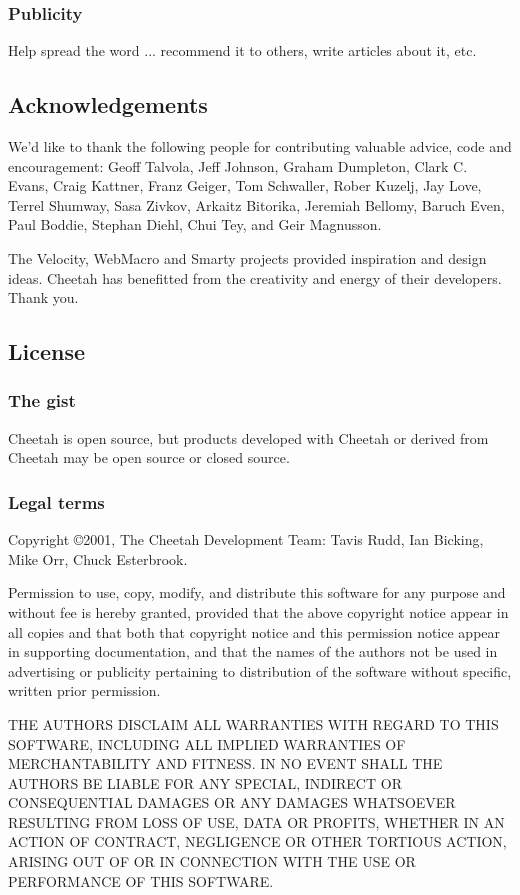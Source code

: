 \subsubsection{Publicity}
Help spread the word ... recommend it to others, write articles about it, etc.

\subsection{Acknowledgements}
\label{intro.acknowledgments}
    
We'd like to thank the following people for contributing valuable advice, code
and encouragement: Geoff Talvola, Jeff Johnson, Graham Dumpleton, Clark C.
Evans, Craig Kattner, Franz Geiger, Tom Schwaller, Rober Kuzelj, Jay Love,
Terrel Shumway, Sasa Zivkov, Arkaitz Bitorika, Jeremiah Bellomy, Baruch Even,
Paul Boddie, Stephan Diehl, Chui Tey, and Geir Magnusson.
    
The Velocity, WebMacro and Smarty projects provided inspiration and design
ideas.  Cheetah has benefitted from the creativity and energy of their
developers. Thank you.

\subsection{License}
\label{intro.license}

\subsubsection{The gist}
Cheetah is open source, but products developed with Cheetah or derived
from Cheetah may be open source or closed source.

\subsubsection{Legal terms}
Copyright \copyright 2001, The Cheetah Development Team: Tavis Rudd, Ian
Bicking, Mike Orr, Chuck Esterbrook.

Permission to use, copy, modify, and distribute this software for any purpose
and without fee is hereby granted, provided that the above copyright notice
appear in all copies and that both that copyright notice and this permission
notice appear in supporting documentation, and that the names of the authors not
be used in advertising or publicity pertaining to distribution of the software
without specific, written prior permission.

THE AUTHORS DISCLAIM ALL WARRANTIES WITH REGARD TO THIS SOFTWARE, INCLUDING ALL
IMPLIED WARRANTIES OF MERCHANTABILITY AND FITNESS. IN NO EVENT SHALL THE AUTHORS
BE LIABLE FOR ANY SPECIAL, INDIRECT OR CONSEQUENTIAL DAMAGES OR ANY DAMAGES
WHATSOEVER RESULTING FROM LOSS OF USE, DATA OR PROFITS, WHETHER IN AN ACTION OF
CONTRACT, NEGLIGENCE OR OTHER TORTIOUS ACTION, ARISING OUT OF OR IN CONNECTION
WITH THE USE OR PERFORMANCE OF THIS SOFTWARE.

